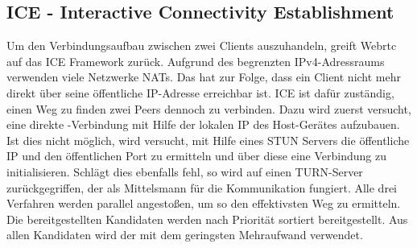 \subsection{ICE - Interactive Connectivity Establishment}
Um den Verbindungsaufbau zwischen zwei Clients auszuhandeln, greift Webrtc auf das ICE\cite{rfc-ice} Framework zurück. Aufgrund des begrenzten IPv4-Adressraums verwenden viele Netzwerke NATs. Das hat zur Folge, dass ein Client nicht mehr direkt über seine öffentliche IP-Adresse erreichbar ist. ICE ist dafür zuständig, einen Weg zu finden zwei Peers dennoch zu verbinden. Dazu wird zuerst versucht, eine direkte \pTp-Verbindung mit Hilfe der lokalen IP des Host-Gerätes aufzubauen. Ist dies nicht möglich, wird versucht, mit Hilfe eines STUN Servers die öffentliche IP und den öffentlichen Port zu ermitteln und über diese eine Verbindung zu initialisieren. Schlägt dies ebenfalls fehl, so wird auf einen TURN-Server zurückgegriffen, der als Mittelsmann für die Kommunikation fungiert. Alle drei Verfahren werden parallel angestoßen, um so den effektivsten Weg zu ermitteln. Die bereitgestellten Kandidaten werden nach Priorität sortiert bereitgestellt. Aus allen Kandidaten wird der mit dem geringsten Mehraufwand verwendet.


